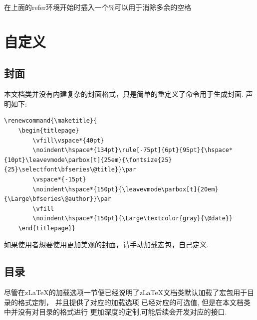 \begin{leftbar}
    在上面的refer环境开始时插入一个\%可以用于消除多余的空格
\end{leftbar}

\section{自定义}
\subsection{封面}
本文档类并没有内建复杂的封面格式，只是简单的重定义了\cmd{\maketitle}命令用于生成封面. 
声明如下:
\begin{verbatim}
\renewcommand{\maketitle}{
    \begin{titlepage}
        \vfill\vspace*{40pt}
        \noindent\hspace*{134pt}\rule[-75pt]{6pt}{95pt}{\hspace*{10pt}\leavevmode\parbox[t]{25em}{\fontsize{25}{25}\selectfont\bfseries\@title}}\par
        \vspace*{-15pt}
        \noindent\hspace*{150pt}{\leavevmode\parbox[t]{20em}{\Large\bfseries\@author}}\par
        \vfill
        \noindent\hspace*{150pt}{\Large\textcolor{gray}{\@date}}
    \end{titlepage}} 
\end{verbatim}

如果使用者想要使用更加美观的封面，请手动加载宏包，自己定义.

\subsection{目录}
尽管在z\LaTeX{}的加载选项一节便已经说明了z\LaTeX{}文档类默认加载了宏包用于目录的格式定制，
并且提供了对应的加载选项 已经对应的可选值, 但是在本文档类中并没有对目录的格式进行
更加深度的定制,可能后续会开发对应的接口. 

